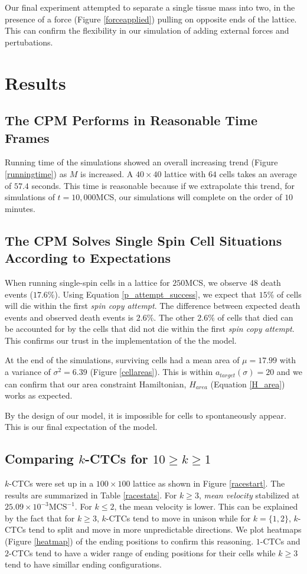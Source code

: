 \documentclass[12pt]{article}
\begin{document}
Our final experiment attempted to separate a single tissue mass into two, in the presence of a force (Figure \ref{forceapplied}) pulling on opposite ends of the lattice. This can confirm the flexibility in our simulation of adding external forces and pertubations.

\section{Results}
\subsection{The CPM Performs in Reasonable Time Frames}
Running time of the simulations showed an overall increasing trend (Figure \ref{runningtime}) as $M$ is increased. A $40\times40$ lattice with $64$ cells takes an average of $57.4$ seconds. This time is reasonable because if we extrapolate this trend, for simulations of $t=10,000$MCS, our simulations will complete on the order of $10$ minutes.

\subsection{The CPM Solves Single Spin Cell Situations According to Expectations}
When running single-spin cells in a lattice for $250$MCS, we observe 48 death events ($17.6\%$). Using Equation \ref{p_attempt_success}, we expect that $15\%$ of cells will die within the first \emph{spin copy attempt}. The difference between expected death events and observed death events is $2.6\%$. The other $2.6\%$ of cells that died can be accounted for by the cells that did not die within the first \emph{spin copy attempt}. This confirms our trust in the implementation of the the model.

At the end of the simulations, surviving cells had a mean area of $\mu = 17.99$ with a variance of $\sigma^2 = 6.39$ (Figure \ref{cellareas}). This is within $a_{target}(\sigma)=20$ and we can confirm that our area constraint Hamiltonian, $H_{area}$ (Equation \ref{H_area}) works as expected. 

By the design of our model, it is impossible for cells to spontaneously appear. This is our final expectation of the model.

\subsection{Comparing $k$-CTCs for $10 \geq k\geq1$} %
$k$-CTCs were set up in a $100\times100$ lattice as shown in Figure \ref{racestart}. The results are summarized in Table \ref{racestats}. For $k\geq3$, \emph{mean velocity} stabilized at $25.09\times10^{-3}\text{MCS}^{-1}$. For $k\leq2$, the mean velocity is lower. This can be explained by the fact that for $k\geq3$, $k$-CTCs tend to move in unison while for $k=\{1,2\}$, $k$-CTCs tend to split and move in more unpredictable directions. We plot heatmaps (Figure \ref{heatmap}) of the ending positions to confirm this reasoning. $1$-CTCs and $2$-CTCs tend to have a wider range of ending positions for their cells while $k\geq3$ tend to have simillar ending configurations.
\end{document}
